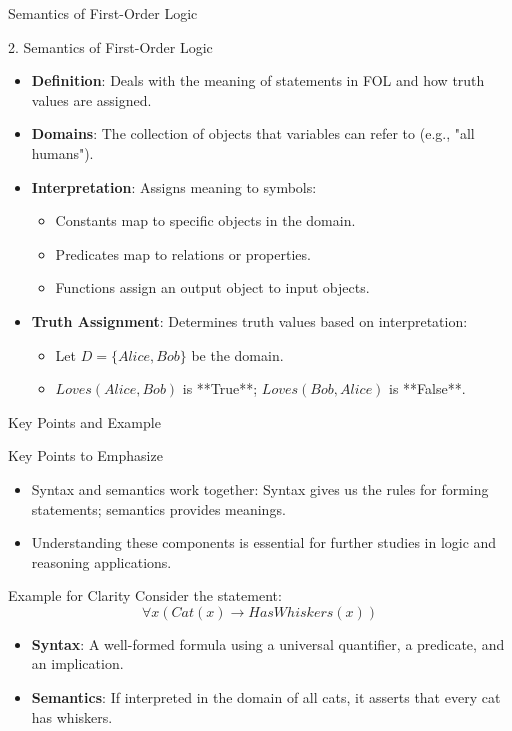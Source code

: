 \documentclass[aspectratio=169]{beamer}
\begin{document}
\begin{frame}[fragile]{Semantics of First-Order Logic}
    \begin{block}{2. Semantics of First-Order Logic}
        \begin{itemize}
            \item \textbf{Definition}: Deals with the meaning of statements in FOL and how truth values are assigned.
            \item \textbf{Domains}: The collection of objects that variables can refer to (e.g., "all humans").
            \item \textbf{Interpretation}: Assigns meaning to symbols:
            \begin{itemize}
                \item Constants map to specific objects in the domain.
                \item Predicates map to relations or properties.
                \item Functions assign an output object to input objects.
            \end{itemize}
            \item \textbf{Truth Assignment}: Determines truth values based on interpretation:
            \begin{itemize}
                \item Let \(D = \{Alice, Bob\}\) be the domain.
                \item \(Loves(Alice, Bob)\) is **True**; \(Loves(Bob, Alice)\) is **False**.
            \end{itemize}
        \end{itemize}
    \end{block}
\end{frame}

\begin{frame}[fragile]{Key Points and Example}
    \begin{block}{Key Points to Emphasize}
        \begin{itemize}
            \item Syntax and semantics work together: Syntax gives us the rules for forming statements; semantics provides meanings.
            \item Understanding these components is essential for further studies in logic and reasoning applications.
        \end{itemize}
    \end{block}
    \begin{block}{Example for Clarity}
        Consider the statement: 
        \[
        \forall x (Cat(x) \rightarrow HasWhiskers(x))
        \]
        \begin{itemize}
            \item \textbf{Syntax}: A well-formed formula using a universal quantifier, a predicate, and an implication.
            \item \textbf{Semantics}: If interpreted in the domain of all cats, it asserts that every cat has whiskers.
        \end{itemize}
    \end{block}
\end{frame}
\end{document}
